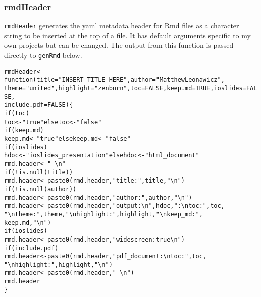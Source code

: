 \documentclass{article}\usepackage[]{graphicx}\usepackage[]{color}
\makeatletter
\newcommand{\hlnum}[1]{\textcolor[rgb]{0.863,0.196,0.184}{#1}}%
\newcommand{\hlstr}[1]{\textcolor[rgb]{0.863,0.196,0.184}{#1}}%
\newcommand{\hlopt}[1]{\textcolor[rgb]{0.576,0.631,0.631}{#1}}%
\newcommand{\hlstd}[1]{\textcolor[rgb]{0.514,0.58,0.588}{#1}}%
\newcommand{\hlkwa}[1]{\textcolor[rgb]{0.796,0.294,0.086}{#1}}%
\newcommand{\hlkwb}[1]{\textcolor[rgb]{0.522,0.6,0}{#1}}%
\newcommand{\hlkwc}[1]{\textcolor[rgb]{0.796,0.294,0.086}{#1}}%
\newcommand{\hlkwd}[1]{\textcolor[rgb]{0.576,0.631,0.631}{#1}}%
\newenvironment{kframe}{%
 \def\at@end@of@kframe{}%
 \ifinner\ifhmode%
  \def\at@end@of@kframe{\end{minipage}}%
  \begin{minipage}{\columnwidth}%
 \fi\fi%
 \def\FrameCommand##1{\hskip\@totalleftmargin \hskip-\fboxsep
 \colorbox{shadecolor}{##1}\hskip-\fboxsep
     \hskip-\linewidth \hskip-\@totalleftmargin \hskip\columnwidth}%
 \MakeFramed {\advance\hsize-\width
   \@totalleftmargin\z@ \linewidth\hsize
   \@setminipage}}%
 {\par\unskip\endMakeFramed%
 \at@end@of@kframe}
\newenvironment{knitrout}{}{} %
\makeatother
\begin{document}
\subsubsection{rmdHeader}
\texttt{rmdHeader} generates the yaml metadata header for Rmd files as a character string to be inserted at the top of a file.
It has default arguments specific to my own projects but can be changed.
The output from this function is passed directly to \texttt{genRmd} below.

\begin{knitrout}
\color{fgcolor}\begin{kframe}
\begin{alltt}
\hlstd{rmdHeader} \hlkwb{<-} \hlkwa{function}\hlstd{(}\hlkwc{title} \hlstd{=} \hlstr{"INSERT_TITLE_HERE"}\hlstd{,} \hlkwc{author} \hlstd{=} \hlstr{"Matthew Leonawicz"}\hlstd{,}
    \hlkwc{theme} \hlstd{=} \hlstr{"united"}\hlstd{,} \hlkwc{highlight} \hlstd{=} \hlstr{"zenburn"}\hlstd{,} \hlkwc{toc} \hlstd{=} \hlnum{FALSE}\hlstd{,} \hlkwc{keep.md} \hlstd{=} \hlnum{TRUE}\hlstd{,} \hlkwc{ioslides} \hlstd{=} \hlnum{FALSE}\hlstd{,}
    \hlkwc{include.pdf} \hlstd{=} \hlnum{FALSE}\hlstd{) \{}
    \hlkwa{if} \hlstd{(toc)}
        \hlstd{toc} \hlkwb{<-} \hlstr{"true"} \hlkwa{else} \hlstd{toc} \hlkwb{<-} \hlstr{"false"}
    \hlkwa{if} \hlstd{(keep.md)}
        \hlstd{keep.md} \hlkwb{<-} \hlstr{"true"} \hlkwa{else} \hlstd{keep.md} \hlkwb{<-} \hlstr{"false"}
    \hlkwa{if} \hlstd{(ioslides)}
        \hlstd{hdoc} \hlkwb{<-} \hlstr{"ioslides_presentation"} \hlkwa{else} \hlstd{hdoc} \hlkwb{<-} \hlstr{"html_document"}
    \hlstd{rmd.header} \hlkwb{<-} \hlstr{"---\textbackslash{}n"}
    \hlkwa{if} \hlstd{(}\hlopt{!}\hlkwd{is.null}\hlstd{(title))}
        \hlstd{rmd.header} \hlkwb{<-} \hlkwd{paste0}\hlstd{(rmd.header,} \hlstr{"title: "}\hlstd{, title,} \hlstr{"\textbackslash{}n"}\hlstd{)}
    \hlkwa{if} \hlstd{(}\hlopt{!}\hlkwd{is.null}\hlstd{(author))}
        \hlstd{rmd.header} \hlkwb{<-} \hlkwd{paste0}\hlstd{(rmd.header,} \hlstr{"author: "}\hlstd{, author,} \hlstr{"\textbackslash{}n"}\hlstd{)}
    \hlstd{rmd.header} \hlkwb{<-} \hlkwd{paste0}\hlstd{(rmd.header,} \hlstr{"output:\textbackslash{}n  "}\hlstd{, hdoc,} \hlstr{":\textbackslash{}n    toc: "}\hlstd{, toc,}
        \hlstr{"\textbackslash{}n    theme: "}\hlstd{, theme,} \hlstr{"\textbackslash{}n    highlight: "}\hlstd{, highlight,} \hlstr{"\textbackslash{}n    keep_md: "}\hlstd{,}
        \hlstd{keep.md,} \hlstr{"\textbackslash{}n"}\hlstd{)}
    \hlkwa{if} \hlstd{(ioslides)}
        \hlstd{rmd.header} \hlkwb{<-} \hlkwd{paste0}\hlstd{(rmd.header,} \hlstr{"    widescreen: true\textbackslash{}n"}\hlstd{)}
    \hlkwa{if} \hlstd{(include.pdf)}
        \hlstd{rmd.header} \hlkwb{<-} \hlkwd{paste0}\hlstd{(rmd.header,} \hlstr{"  pdf_document:\textbackslash{}n    toc: "}\hlstd{, toc,}
            \hlstr{"\textbackslash{}n    highlight: "}\hlstd{, highlight,} \hlstr{"\textbackslash{}n"}\hlstd{)}
    \hlstd{rmd.header} \hlkwb{<-} \hlkwd{paste0}\hlstd{(rmd.header,} \hlstr{"---\textbackslash{}n"}\hlstd{)}
    \hlstd{rmd.header}
\hlstd{\}}
\end{alltt}
\end{kframe}
\end{knitrout}
\end{document}
